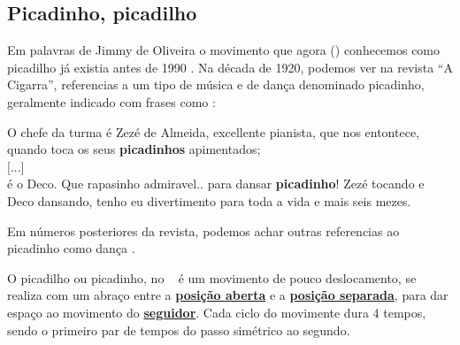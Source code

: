 
\subsection{ Picadinho, picadilho}


Em palavras de Jimmy de Oliveira o movimento que agora (\AnoLivro) conhecemos como picadilho 
já existia antes de 1990 \cite{sambafunkeadoJimmyDeOliveiraPart1}.
Na década de 1920, podemos ver na revista ``A Cigarra'', 
referencias a um tipo de música e de dança denominado picadinho,
geralmente indicado com frases como \cite[pp. 13]{picadinho1}:
\begin{citando}
O chefe da turma é Zezé de Almeida, excellente pianista,
que nos entontece, quando toca os seus \textbf{picadinhos} apimentados;~\\
$[$...$]$~\\
é o Deco. Que rapasinho admiravel.. para dansar \textbf{picadinho}! 
Zezé tocando e Deco dansando, tenho eu divertimento 
para toda a vida e mais seis mezes.
\end{citando}


Em números posteriores da revista, 
podemos achar outras referencias ao picadinho como dança \cite[pp. 52]{picadinho2} \cite[pp. 49]{picadinho3}.


O picadilho ou picadinho, no \AnoLivro~ é um movimento de pouco deslocamento, 
se realiza com um abraço entre a \hyperref[def:open-position]{\textbf{posição aberta}} e a 
\hyperref[def:apart-position]{\textbf{posição separada}}, 
para dar espaço ao movimento do \hyperref[def:Seguidor]{\textbf{seguidor}}.
Cada ciclo do movimente dura 4 tempos, sendo o primeiro par de tempos do passo simétrico ao segundo.

